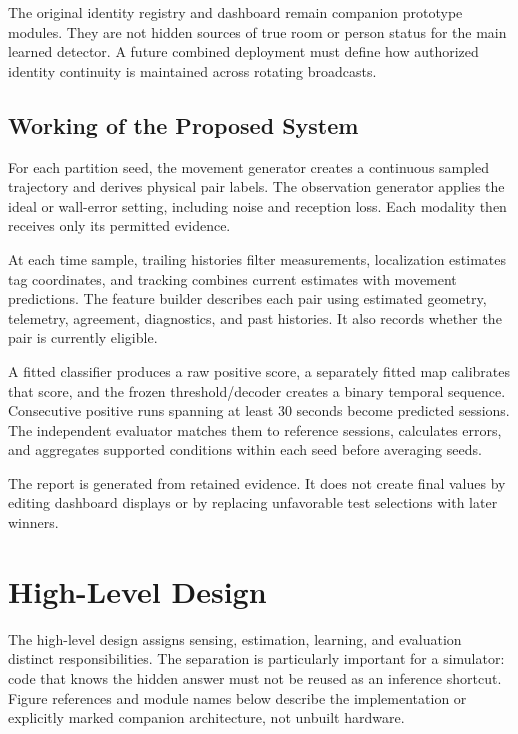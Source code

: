 \documentclass[12pt,a4paper]{report}
\begin{document}
The original identity registry and dashboard remain companion prototype modules. They are not hidden sources of true room or person status for the main learned detector. A future combined deployment must define how authorized identity continuity is maintained across rotating broadcasts.

\subsection{Working of the Proposed System}
For each partition seed, the movement generator creates a continuous sampled trajectory and derives physical pair labels. The observation generator applies the ideal or wall-error setting, including noise and reception loss. Each modality then receives only its permitted evidence.

At each time sample, trailing histories filter measurements, localization estimates tag coordinates, and tracking combines current estimates with movement predictions. The feature builder describes each pair using estimated geometry, telemetry, agreement, diagnostics, and past histories. It also records whether the pair is currently eligible.

A fitted classifier produces a raw positive score, a separately fitted map calibrates that score, and the frozen threshold/decoder creates a binary temporal sequence. Consecutive positive runs spanning at least 30 seconds become predicted sessions. The independent evaluator matches them to reference sessions, calculates errors, and aggregates supported conditions within each seed before averaging seeds.

The report is generated from retained evidence. It does not create final values by editing dashboard displays or by replacing unfavorable test selections with later winners.

\section{High-Level Design}
The high-level design assigns sensing, estimation, learning, and evaluation distinct responsibilities. The separation is particularly important for a simulator: code that knows the hidden answer must not be reused as an inference shortcut. Figure references and module names below describe the implementation or explicitly marked companion architecture, not unbuilt hardware.
\end{document}
